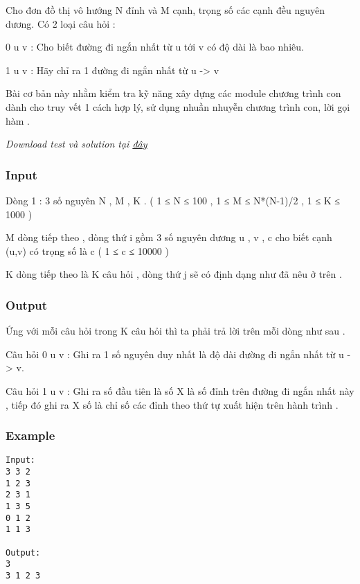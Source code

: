 



   Cho đơn đồ thị vô hướng N đỉnh và M cạnh, trọng số các cạnh đều nguyên dương. Có 2 loại câu hỏi :   


   0 u v : Cho biết đường đi ngắn nhất từ u tới v có độ dài là bao nhiêu.   


   1 u v : Hãy chỉ ra 1 đường đi ngắn nhất từ u -> v   


   Bài cơ bản này nhằm kiểm tra kỹ năng xây dựng các module chương trình con dành cho truy vết 1 cách hợp lý, sử dụng nhuần nhuyễn chương trình con, lời gọi hàm .   





\textit{    Download test và solution tại    \href{http://vn.spoj.pl/content/floyd.rar}{     đây    }}

\subsubsection{   Input  }

   Dòng 1 : 3 số nguyên N , M , K . ( 1 ≤ N ≤ 100 , 1 ≤ M ≤ N*(N-1)/2  , 1 ≤ K ≤ 1000 )   


   M dòng tiếp theo , dòng thứ i gồm 3 số nguyên dương u , v , c cho biết cạnh (u,v) có trọng số là c ( 1 ≤ c ≤ 10000 )   


   K dòng tiếp theo là K câu hỏi , dòng thứ j sẽ có định dạng như đã nêu ở trên .   




\subsubsection{   Output  }

   Ứng với mỗi câu hỏi trong K câu hỏi thì ta phải trả lời trên mỗi dòng như sau .   


   Câu hỏi 0 u v : Ghi ra 1 số nguyên duy nhất là độ dài đường đi ngắn nhất từ u -> v.   


   Câu hỏi 1 u v : Ghi ra số đầu tiên là số X là số đỉnh trên đường đi ngắn nhất này , tiếp đó ghi ra X số là chỉ số các đỉnh theo thứ tự xuất hiện trên hành trình .   




\subsubsection{   Example  }
\begin{verbatim}
Input:
3 3 2
1 2 3
2 3 1
1 3 5
0 1 2
1 1 3

Output:
3
3 1 2 3
\end{verbatim}
